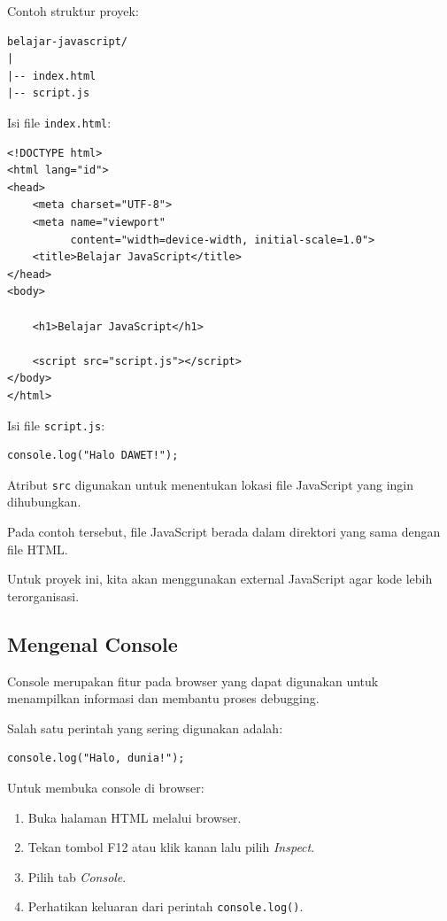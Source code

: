 \documentclass[12pt,a4paper]{article}
\begin{document}
Contoh struktur proyek:

\begin{lstlisting}
belajar-javascript/
|
|-- index.html
|-- script.js
\end{lstlisting}

Isi file \texttt{index.html}:

\begin{lstlisting}
<!DOCTYPE html>
<html lang="id">
<head>
    <meta charset="UTF-8">
    <meta name="viewport"
          content="width=device-width, initial-scale=1.0">
    <title>Belajar JavaScript</title>
</head>
<body>

    <h1>Belajar JavaScript</h1>

    <script src="script.js"></script>
</body>
</html>
\end{lstlisting}

Isi file \texttt{script.js}:

\begin{lstlisting}
console.log("Halo DAWET!");
\end{lstlisting}

Atribut \texttt{src} digunakan untuk menentukan
lokasi file JavaScript yang ingin dihubungkan.

Pada contoh tersebut, file JavaScript berada
dalam direktori yang sama dengan file HTML.

Untuk proyek ini, kita akan menggunakan external
JavaScript agar kode lebih terorganisasi.

\subsection{Mengenal Console}

Console merupakan fitur pada browser yang dapat
digunakan untuk menampilkan informasi dan membantu
proses debugging.

Salah satu perintah yang sering digunakan adalah:

\begin{lstlisting}
console.log("Halo, dunia!");
\end{lstlisting}

Untuk membuka console di browser:

\begin{enumerate}
    \item Buka halaman HTML melalui browser.
    \item Tekan tombol F12 atau klik kanan lalu pilih
    \textit{Inspect}.
    \item Pilih tab \textit{Console}.
    \item Perhatikan keluaran dari perintah
    \texttt{console.log()}.
\end{enumerate}
\end{document}
